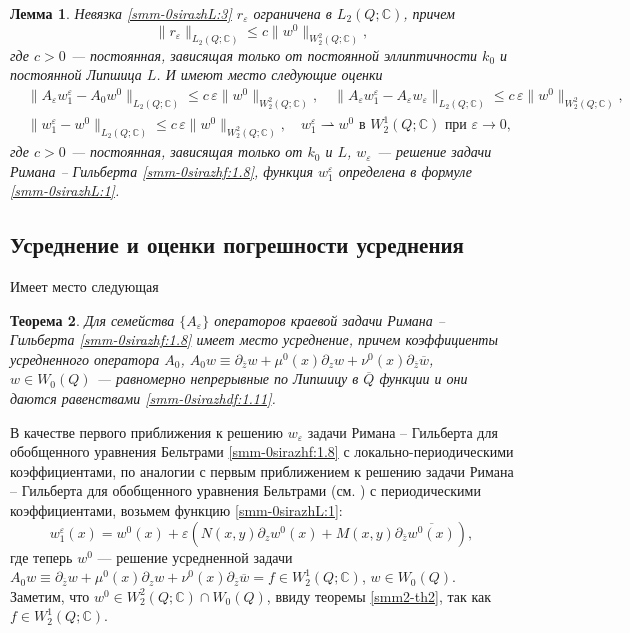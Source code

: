 \documentclass[a4paper,12pt]{article}
\newtheorem{theorem}{Теорема}[section]
\newtheorem{lemma}[theorem]{Лемма}
\theoremstyle{definition}
\begin{document}
\begin{lemma} { Невязка \eqref{smm-0sirazhL:3} $r_\varepsilon$ ограничена в $L_2(Q;\mathbb{C})$, причем}
\begin{equation}\label{smm-0sirazhL:0}
	\|r_\varepsilon\|_{L_2(Q;\mathbb{C})}\leqslant c\|w^0\|_{W_2^2(Q;\mathbb{C})},
\end{equation}
{ где $c>0$ --- постоянная, зависящая только от постоянной эллиптичности $k_0$ и постоянной Липшица $L$. И имеют место следующие оценки}
\begin{align}\label{smm-0sirazh4.12}
	&\|A_\varepsilon w_1^\varepsilon-A_0w^0\|_{L_2(Q; \mathbb{C})}\leqslant c\,\varepsilon\|w^0\|_
	{W_2^2 (Q; \mathbb{C})},\quad\|A_\varepsilon w_1^\varepsilon-A_\varepsilon w_\varepsilon\|_{L_2(Q; \mathbb{C})}\leqslant c\,\varepsilon\|w^0\|_
	{W_2^2 (Q; \mathbb{C})},\\\label{smm-0sirazh4.13}
	& \|w_1^\varepsilon-w^0\|_{L_2 (Q; \mathbb{C})}\leqslant c\,\varepsilon\|w^0\|_
	{W_2^2 (Q; \mathbb{C})},\quad w_1^\varepsilon\rightharpoonup w^0 \text{\ \ в \ \  } W_2^1(Q;\mathbb{C})\text{\  при \ \ } \varepsilon\to0,
\end{align}
{ где $c>0$ --- постоянная, зависящая только от $k_0$ и $L$,
	$w_\varepsilon$ ---  решение задачи Римана -- Гильберта \eqref{smm-0sirazhf:1.8}, функция
	$w_1^\varepsilon$ определена в формуле \eqref{smm-0sirazhL:1}}.
\end{lemma}



\subsection{Усреднение и оценки погрешности усреднения}

Имеет место  следующая

\begin{theorem} { Для семейства $\{A_\varepsilon\}$ операторов краевой
	задачи Римана -- Гильберта \eqref{smm-0sirazhf:1.8} имеет место усреднение, причем коэффициенты
	усредненного оператора $A_0$, $A_0w\equiv\partial_{\overline{z}}w+\mu^0(x)\partial_zw+\nu^0(x)\partial_{\overline{z}}
	\overline w$, $w\in W_0(Q)$ --- равномерно непрерывные  по Липшицу в $\overline{Q}$ функции и они даются равенствами \eqref{smm-0sirazhdf:1.11}.}
\end{theorem}

В качестве первого приближения к решению $w_\varepsilon$  задачи
Римана -- Гильберта  для обобщенного уравнения Бельтрами \eqref{smm-0sirazhf:1.8} с локально-периодическими коэффициентами, по аналогии с первым приближением к решению  задачи Римана -- Гильберта для обобщенного уравнения Бельтрами (см. \cite{smm-8}) с периодическими коэффициентами, возьмем функцию \eqref{smm-0sirazhL:1}:
$$ w_1^\varepsilon(x)=w^0(x)+\varepsilon\left(N(x,y)\partial_zw^0(x)+M(x,y)\partial_{\bar{z}}\overline{w^0(x)}\right),$$ где теперь $w^0$ --- решение усредненной задачи $A_0w\equiv\partial_{\overline{z}}w+\mu^0(x)\partial_zw+\nu^0(x)\partial_{\overline{z}}
\overline{w}=f\in W_2^1(Q;\mathbb{C})$, $w\in W_0(Q)$. Заметим, что $w^0\in W_2^2(Q;\mathbb{C})\cap W_0(Q)$, ввиду
теоремы \ref{smm2-th2}, так как $f\in W_2^1(Q;\mathbb{C})$.
\end{document}
